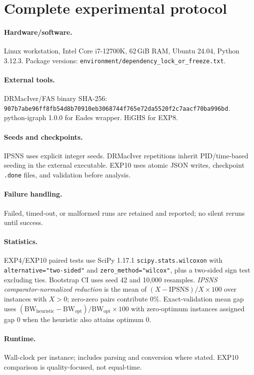 \section{Complete experimental protocol}
\label{sec:or1-protocol}

\paragraph{Hardware/software.} Linux workstation, Intel Core i7-12700K, 62\,GiB RAM, Ubuntu 24.04, Python 3.12.3. Package versions: \texttt{environment/dependency\_lock\_or\_freeze.txt}.

\paragraph{External tools.} DRMacIver/FAS binary SHA-256: \texttt{907b7abe96ff8fb54d8b70910eb3068744f765e72da5520f2c7aacf70ba996bd}. python-igraph 1.0.0 for Eades wrapper. HiGHS for EXP8.

\paragraph{Seeds and checkpoints.} IPSNS uses explicit integer seeds. DRMacIver repetitions inherit PID/time-based seeding in the external executable. EXP10 uses atomic JSON writes, checkpoint \texttt{.done} files, and validation before analysis.

\paragraph{Failure handling.} Failed, timed-out, or malformed runs are retained and reported; no silent reruns until success.

\paragraph{Statistics.} EXP4/EXP10 paired tests use SciPy 1.17.1 \texttt{scipy.stats.wilcoxon} with \texttt{alternative="two-sided"} and \texttt{zero\_method="wilcox"}, plus a two-sided sign test excluding ties. Bootstrap CI uses seed 42 and 10,000 resamples. \emph{IPSNS comparator-normalized reduction} is the mean of $(X-\mathrm{IPSNS})/X\times 100$ over instances with $X>0$; zero-zero pairs contribute 0\%. Exact-validation mean gap uses $(\mathrm{BW}_{\mathrm{heuristic}}-\mathrm{BW}_{\mathrm{opt}})/\mathrm{BW}_{\mathrm{opt}}\times 100$ with zero-optimum instances assigned gap 0 when the heuristic also attains optimum 0.

\paragraph{Runtime.} Wall-clock per instance; includes parsing and conversion where stated. EXP10 comparison is quality-focused, not equal-time.
